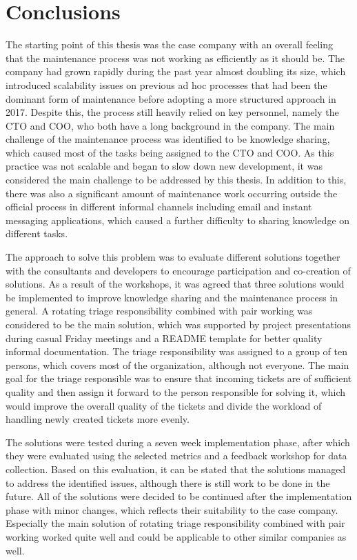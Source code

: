 \chapter{Conclusions}
\label{chapter:conclusions}

The starting point of this thesis was the case company with an overall feeling that the maintenance process was not working as efficiently as it should be. The company had grown rapidly during the past year
almost doubling its size, which introduced scalability issues on previous ad hoc processes that had been the dominant form of maintenance before adopting a more structured approach in 2017. Despite this,
the process still heavily relied on key personnel, namely the CTO and COO, who both have a long background in the company. The main challenge of the maintenance process was identified to be knowledge sharing,
which caused most of the tasks being assigned to the CTO and COO. As this practice was not scalable and began to slow down new development, it was considered the main challenge to be addressed by this thesis.
In addition to this, there was also a significant amount of maintenance work occurring outside the official process in different informal channels including email and instant messaging applications, which
caused a further difficulty to sharing knowledge on different tasks.

The approach to solve this problem was to evaluate different solutions together with the consultants and developers to encourage participation and co-creation of solutions. As a result of the workshops, it was
agreed that three solutions would be implemented to improve knowledge sharing and the maintenance process in general. A rotating triage responsibility combined with pair working was considered to be the main
solution, which was supported by project presentations during casual Friday meetings and a README template for better quality informal documentation. The triage responsibility was assigned to a group of ten
persons, which covers most of the organization, although not everyone. The main goal for the triage responsible was to ensure that incoming tickets are of sufficient quality and then assign it forward to the
person responsible for solving it, which would improve the overall quality of the tickets and divide the workload of handling newly created tickets more evenly.

The solutions were tested during a seven week implementation phase, after which they were evaluated using the selected metrics and a feedback workshop for data collection. Based on this evaluation, it can be stated
that the solutions managed to address the identified issues, although there is still work to be done in the future. All of the solutions were decided to be continued after the implementation phase with minor
changes, which reflects their suitability to the case company. Especially the main solution of rotating triage responsibility combined with pair working worked quite well and could be applicable to other
similar companies as well.


